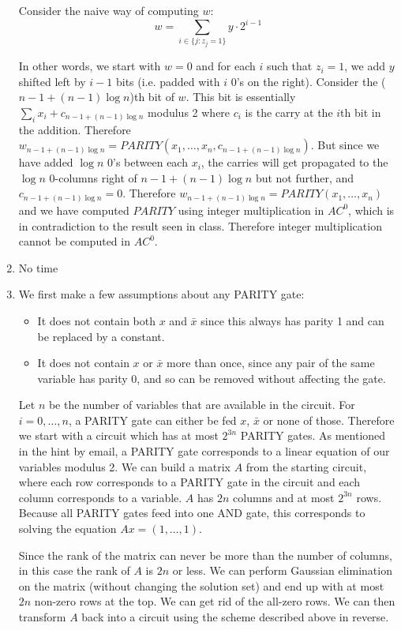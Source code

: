 \documentclass{article}
\begin{document}
\begin{enumerate}
Consider the naive way of computing $w$:
$$ w=\sum_{i \in \{j : z_j=1\}}{y \cdot 2^{i-1}} $$

In other words, we start with $w=0$ and for each $i$ such that $z_i=1$, we add $y$ shifted left by $i-1$ bits (i.e. padded with $i$ 0's on the right). Consider the ($n-1+(n-1)\log n$)th bit of $w$. This bit is essentially $\sum_i{x_i} + c_{n-1+(n-1)\log n}$ modulus 2 where $c_i$ is the carry at the $i$th bit in the addition. Therefore $w_{n-1+(n-1)\log n}=PARITY(x_1,\dotsc,x_n,c_{n-1+(n-1)\log n})$. But since we have added $\log n$ 0's between each $x_i$, the carries will get propagated to the $\log n$ 0-columns right of $n-1+(n-1)\log n$ but not further, and $c_{n-1+(n-1)\log n}=0$. Therefore $w_{n-1+(n-1)\log n}=PARITY(x_1,\dotsc,x_n)$ and we have computed $PARITY$ using integer multiplication in $AC^0$, which is in contradiction to the result seen in class. Therefore integer multiplication cannot be computed in $AC^0$.

\item No time %

\newpage
\item We first make a few assumptions about any PARITY gate:
\begin{itemize}
\item It does not contain both $x$ and $\bar x$ since this always has parity 1 and can be replaced by a constant.
\item It does not contain $x$ or $\bar x$ more than once, since any pair of the same variable has parity 0, and so can be removed without affecting the gate.
\end{itemize}

Let $n$ be the number of variables that are available in the circuit. For $i=0,\dotsc,n$, a PARITY gate can either be fed $x$, $\bar x$ or none of those. Therefore we start with a circuit which has at most $2^{3n}$ PARITY gates. As mentioned in the hint by email, a PARITY gate corresponds to a linear equation of our variables modulus 2. We can build a matrix $A$ from the starting circuit, where each row corresponds to a PARITY gate in the circuit and each column corresponds to a variable. $A$ has $2n$ columns and at most $2^{3n}$ rows. Because all PARITY gates feed into one AND gate, this corresponds to solving the equation $Ax=(1,\dotsc,1)$.

Since the rank of the matrix can never be more than the number of columns, in this case the rank of $A$ is $2n$ or less. We can perform Gaussian elimination on the matrix (without changing the solution set) and end up with at most $2n$ non-zero rows at the top. We can get rid of the all-zero rows. We can then transform $A$ back into a circuit using the scheme described above in reverse.

\end{enumerate}
\end{document}
